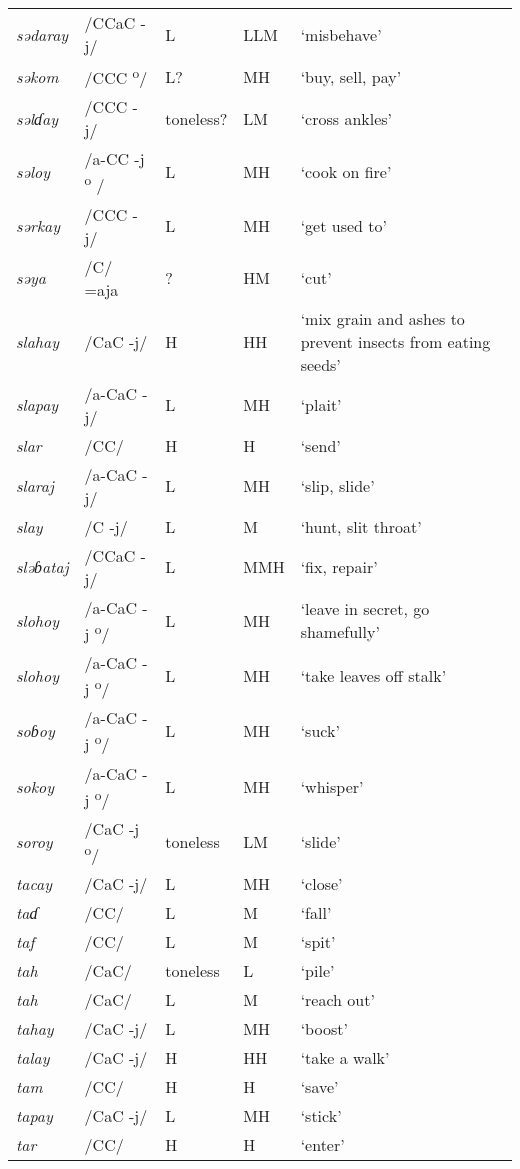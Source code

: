 \begin{small}
\begin{longtable}{lp{1.75cm}p{1.75cm}p{1.75cm}p{3cm}}
\textit{sədaray} & /CCaC -j/ & L & LLM & ‘misbehave’\\
\textit{sək}\textit{om} & /CCC \textsuperscript{o}/ & L? & MH & ‘buy, sell, pay’\\
\textit{səlɗay} & /CCC -j/ & toneless? & LM & ‘cross ankles’\\
\textit{səloy} & /a-CC -j\textsuperscript{ o} / & L & MH & ‘cook on fire’\\
\textit{sərkay} & /CCC -j/ & L & MH & ‘get used to’\\
\textit{səya} & /C/ =aja & ? & HM & ‘cut’\\
\textit{slahay} & /CaC -j/ & H & HH & ‘mix grain and ashes to prevent insects from eating seeds’\\
\textit{slapay} & /a-CaC -j/ & L & MH & ‘plait’\\
\textit{slar} & /CC/ & H & H & ‘send’\\
\textit{slaraj} & /a-CaC -j/ & L & MH & ‘slip, slide’\\
\textit{slay} & /C -j/ & L & M & ‘hunt, slit throat’\\
\textit{sləɓataj} & /CCaC -j/ & L & MMH & ‘fix, repair’\\
\textit{slohoy} & /a-CaC -j\textsuperscript{ o}/ & L & MH & ‘leave in secret, go shamefully’\\
\textit{slohoy} & /a-CaC -j\textsuperscript{ o}/ & L & MH & ‘take leaves off stalk’\\
\textit{soɓoy} & /a-CaC -j\textsuperscript{ o}/ & L & MH & ‘suck’\\
\textit{sokoy} & /a-CaC -j\textsuperscript{ o}/ & L & MH & ‘whisper’\\
\textit{soroy} & /CaC -j\textsuperscript{ o}/ & toneless & LM & ‘slide’\\
\textit{tacay} & /CaC -j/ & L & MH & ‘close’\\
\textit{taɗ} & /CC/ & L & M & ‘fall’\\
\textit{taf} & /CC/ & L & M & ‘spit’\\
\textit{tah} & /CaC/ & toneless & L & ‘pile’\\
\textit{tah} & /CaC/ & L & M & ‘reach out’\\
\textit{tahay} & /CaC -j/ & L & MH & ‘boost’\\
\textit{talay} & /CaC -j/ & H & HH & ‘take a walk’\\
\textit{tam} & /CC/ & H & H & ‘save’\\
\textit{tapay} & /CaC -j/ & L & MH & ‘stick’\\
\textit{tar} & /CC/ & H & H & ‘enter’\\

\end{longtable}
\end{small}
